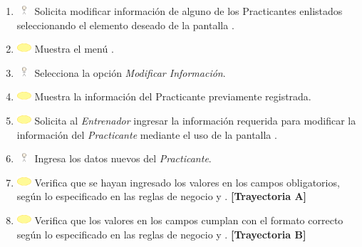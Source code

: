 \begin{enumerate}
	\item \includegraphics[width=15pt, height=10pt]{./Figuras/iconosCU/usuario.png} Solicita modificar información de alguno de los Practicantes enlistados seleccionando el elemento deseado de la pantalla .
	\item \includegraphics[width=15pt]{./Figuras/iconosCU/herramienta.png} Muestra el menú .
	\item \includegraphics[width=15pt, height=10pt]{./Figuras/iconosCU/usuario.png} Selecciona la opción \textit{Modificar Información}.
	\item \includegraphics[width=15pt]{./Figuras/iconosCU/herramienta.png} Muestra la información del Practicante previamente registrada.
	\item \includegraphics[width=15pt]{./Figuras/iconosCU/herramienta.png} Solicita al \textit{Entrenador} ingresar la información requerida para modificar la información del \textit{Practicante} mediante el uso de la pantalla .
	\item \includegraphics[width=15pt, height=10pt]{./Figuras/iconosCU/usuario.png} Ingresa los datos nuevos del \textit{Practicante}.
	\item \includegraphics[width=15pt]{./Figuras/iconosCU/herramienta.png} Verifica que se hayan ingresado los valores en los campos obligatorios, según lo especificado en las reglas de negocio  y  . \textbf{[Trayectoria A]}
	\item \includegraphics[width=15pt]{./Figuras/iconosCU/herramienta.png} Verifica que los valores en los campos cumplan con el formato correcto según lo especificado en las reglas de negocio  y  . \textbf{[Trayectoria B]}

\end{enumerate}
